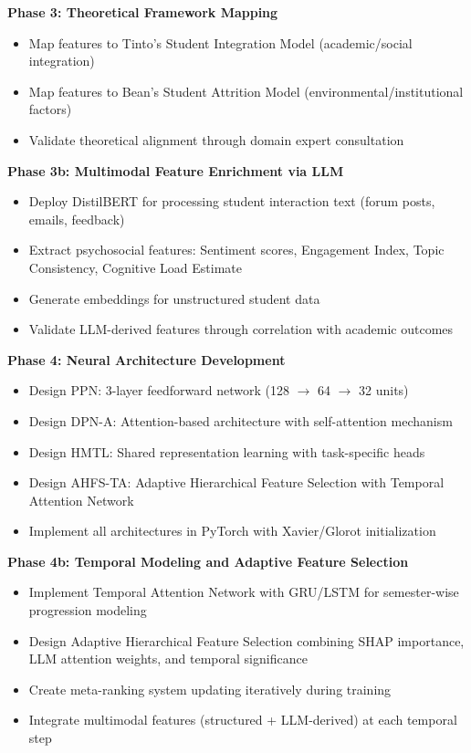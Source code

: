\textbf{Phase 3: Theoretical Framework Mapping}
\begin{itemize}
\item Map features to Tinto's Student Integration Model (academic/social integration)
\item Map features to Bean's Student Attrition Model (environmental/institutional factors)
\item Validate theoretical alignment through domain expert consultation
\end{itemize}

\textbf{Phase 3b: Multimodal Feature Enrichment via LLM}
\begin{itemize}
\item Deploy DistilBERT for processing student interaction text (forum posts, emails, feedback)
\item Extract psychosocial features: Sentiment scores, Engagement Index, Topic Consistency, Cognitive Load Estimate
\item Generate embeddings for unstructured student data
\item Validate LLM-derived features through correlation with academic outcomes
\end{itemize}

\textbf{Phase 4: Neural Architecture Development}
\begin{itemize}
\item Design PPN: 3-layer feedforward network (128 $\to$ 64 $\to$ 32 units)
\item Design DPN-A: Attention-based architecture with self-attention mechanism
\item Design HMTL: Shared representation learning with task-specific heads
\item Design AHFS-TA: Adaptive Hierarchical Feature Selection with Temporal Attention Network
\item Implement all architectures in PyTorch with Xavier/Glorot initialization
\end{itemize}

\textbf{Phase 4b: Temporal Modeling and Adaptive Feature Selection}
\begin{itemize}
\item Implement Temporal Attention Network with GRU/LSTM for semester-wise progression modeling
\item Design Adaptive Hierarchical Feature Selection combining SHAP importance, LLM attention weights, and temporal significance
\item Create meta-ranking system updating iteratively during training
\item Integrate multimodal features (structured + LLM-derived) at each temporal step
\end{itemize}

